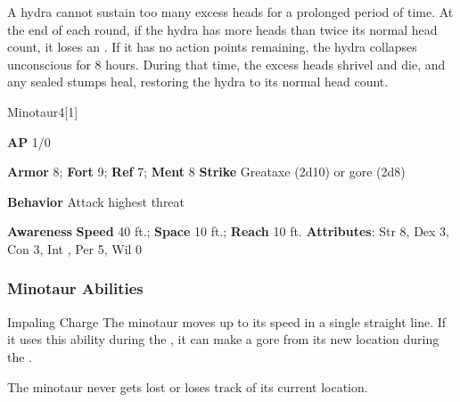A hydra cannot sustain too many excess heads for a prolonged period of time.
At the end of each round, if the hydra has more heads than twice its normal head count, it loses an .
If it has no action points remaining, the hydra collapses unconscious for 8 hours.
During that time, the excess heads shrivel and die, and any sealed stumps heal, restoring the hydra to its normal head count.

\begin{monsection}{Minotaur}{4}[1]
\vspace{-1em}\vspace{-1em}
\begin{spellcontent}
\begin{spelltargetinginfo}
{\textbf{AP} 1/0}

\pari \textbf{Armor} 8;
\textbf{Fort} 9;
\textbf{Ref} 7;
\textbf{Ment} 8
\pari \textbf{Strike} Greataxe  (2d10) or gore  (2d8)



\pari \textbf{Behavior} Attack highest threat
\end{spelltargetinginfo}
\end{spellcontent}

\begin{monsterfooter}
\pari \textbf{Awareness} 
\pari \textbf{Speed} 40 ft.;
\textbf{Space} 10 ft.;
\textbf{Reach} 10 ft.
\pari \textbf{Attributes}:
Str 8,
Dex 3,
Con 3,
Int ,
Per 5,
Wil 0
\end{monsterfooter}
\end{monsection}


\subsubsection{Minotaur Abilities}

\begin{freeability}{Impaling Charge}
The minotaur moves up to its speed in a single straight line.
If it uses this ability during the , it can make a gore  from its new location during the .
\end{freeability}

The minotaur never gets lost or loses track of its current location.

